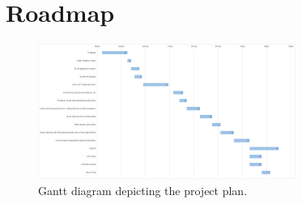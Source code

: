 
\chapter{Roadmap} 
\label{ch:Chapter5}
\vfill \minitoc \newpage

\begin{figure}[!ht]
	\centering
	\includegraphics[width=0.75\textwidth]{./Chapter5/Figures/planning.png}
	\caption{Gantt diagram depicting the project plan.}
	\label{fig:GanttDiagram}
\end{figure}






